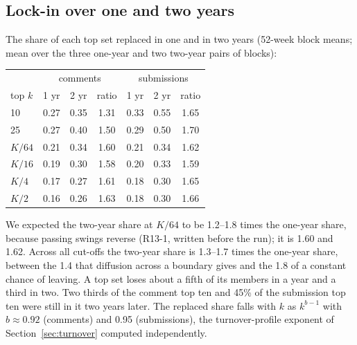 \documentclass[10pt]{article}
\begin{document}
\subsection{Lock-in over one and two years}
The share of each top set replaced in one and in two years (52-week block means; mean over the three one-year and two two-year pairs of blocks):
\begin{center}\small\begin{tabular}{lcccccc}
\toprule
 & \multicolumn{3}{c}{comments} & \multicolumn{3}{c}{submissions}\\
top $k$ & 1 yr & 2 yr & ratio & 1 yr & 2 yr & ratio\\
\midrule
10 & 0.27 & 0.35 & 1.31 & 0.33 & 0.55 & 1.65\\
25 & 0.27 & 0.40 & 1.50 & 0.29 & 0.50 & 1.70\\
$K/64$ & 0.21 & 0.34 & 1.60 & 0.21 & 0.34 & 1.62\\
$K/16$ & 0.19 & 0.30 & 1.58 & 0.20 & 0.33 & 1.59\\
$K/4$ & 0.17 & 0.27 & 1.61 & 0.18 & 0.30 & 1.65\\
$K/2$ & 0.16 & 0.26 & 1.63 & 0.18 & 0.30 & 1.66\\
\bottomrule
\end{tabular}\end{center}
We expected the two-year share at $K/64$ to be 1.2--1.8 times the one-year share, because passing swings reverse (R13-1, written before the run); it is 1.60 and 1.62. Across all cut-offs the two-year share is 1.3--1.7 times the one-year share, between the 1.4 that diffusion across a boundary gives and the 1.8 of a constant chance of leaving. A top set loses about a fifth of its members in a year and a third in two. Two thirds of the comment top ten and 45\% of the submission top ten were still in it two years later. The replaced share falls with $k$ as $k^{b-1}$ with $b \approx 0.92$ (comments) and 0.95 (submissions), the turnover-profile exponent of Section~\ref{sec:turnover} computed independently.
\end{document}
